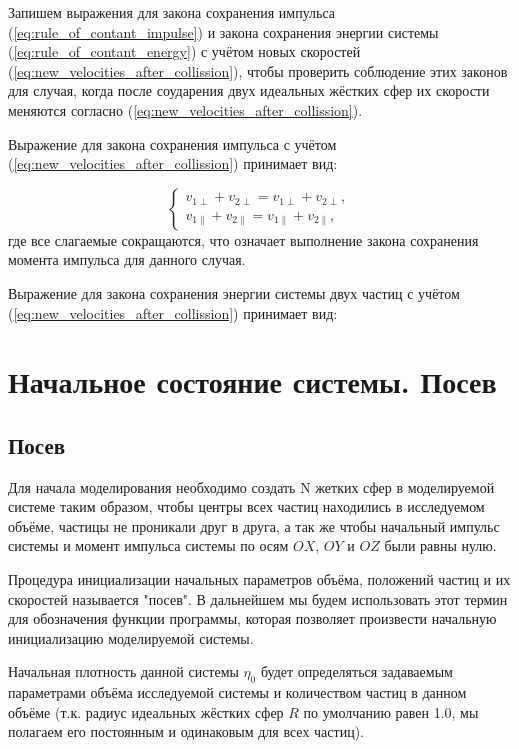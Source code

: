 \documentclass{article}
\begin{document}
Запишем выражения для закона сохранения импульса (\ref{eq:rule_of_contant_impulse}) и закона сохранения энергии системы (\ref{eq:rule_of_contant_energy}) с учётом новых скоростей (\ref{eq:new_velocities_after_collission}), чтобы проверить соблюдение этих законов для случая, когда после соударения двух идеальных жёстких сфер их скорости меняются согласно (\ref{eq:new_velocities_after_collission}).

Выражение для закона сохранения импульса с учётом (\ref{eq:new_velocities_after_collission}) принимает вид:

\begin{equation}
    \begin{cases}
        v_{1\perp} + v_{2\perp} = v_{1\perp} + v_{2\perp},
        \\
        v_{1\parallel} + v_{2\parallel} = v_{1\parallel} + v_{2\parallel},
    \end{cases}
\end{equation}
где все слагаемые сокращаются, что означает выполнение закона сохранения момента импульса для данного случая.

Выражение для закона сохранения энергии системы двух частиц с учётом (\ref{eq:new_velocities_after_collission}) принимает вид:



\newpage
\section{Начальное состояние системы. Посев}

\subsection{Посев}

Для начала моделирования необходимо создать N жетких сфер в моделируемой системе таким образом, чтобы центры всех частиц находились в исследуемом объёме, частицы не проникали друг в друга, а так же чтобы начальный импульс системы и момент импульса системы по осям $ OX $, $ OY $ и $ OZ $ были равны нулю.

Процедура инициализации начальных параметров объёма, положений частиц и их скоростей называется "посев". В дальнейшем мы будем использовать этот термин для обозначения функции программы, которая позволяет произвести начальную инициализацию моделируемой системы.

Начальная плотность данной системы $ \eta_0 $ будет определяться задаваемым параметрами объёма исследуемой системы и количеством частиц в данном объёме (т.к. радиус идеальных жёстких сфер $R$ по умолчанию равен 1.0, мы полагаем его постоянным и одинаковым для всех частиц).
\end{document}
